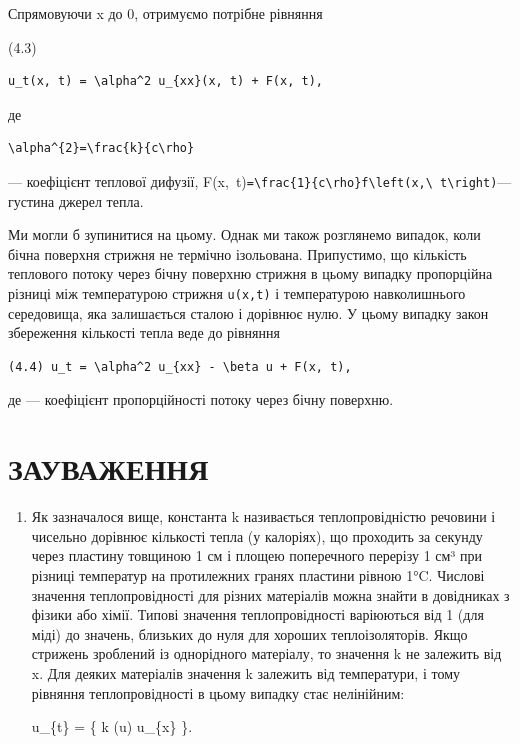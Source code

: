 \documentclass[
  ukrainian,
]{article}
\begin{document}
Спрямовуючи \Delta x до 0, отримуємо потрібне рівняння

(4.3)

\begin{verbatim}
u_t(x, t) = \alpha^2 u_{xx}(x, t) + F(x, t),
\end{verbatim}

де

\begin{verbatim}
\alpha^{2}=\frac{k}{c\rho}
\end{verbatim}

--- коефіцієнт теплової дифузії,
F\left(x,~t\right)\texttt{=\textbackslash{}frac\{1\}\{c\textbackslash{}rho\}f\textbackslash{}left(x,\textbackslash{}\ t\textbackslash{}right)}---
густина джерел тепла.

Ми могли б зупинитися на цьому. Однак ми також розглянемо випадок, коли
бічна поверхня стрижня не термічно ізольована. Припустимо, що кількість
теплового потоку через бічну поверхню стрижня в цьому випадку
пропорційна різниці між температурою стрижня \texttt{u(x,t)} і
температурою навколишнього середовища, яка залишається сталою і дорівнює
нулю. У цьому випадку закон збереження кількості тепла веде до рівняння

\begin{verbatim}
(4.4) u_t = \alpha^2 u_{xx} - \beta u + F(x, t),
\end{verbatim}

де \beta --- коефіцієнт пропорційності потоку через бічну поверхню.

\section{ЗАУВАЖЕННЯ}\label{ux437ux430ux443ux432ux430ux436ux435ux43dux43dux44f-3}

\begin{enumerate}
\def\labelenumi{\arabic{enumi}.}
\item
  Як зазначалося вище, константа k називається теплопровідністю речовини
  і чисельно дорівнює кількості тепла (у калоріях), що проходить за
  секунду через пластину товщиною 1 см і площею поперечного перерізу 1
  см³ при різниці температур на протилежних гранях пластини рівною 1°C.
  Числові значення теплопровідності для різних матеріалів можна знайти в
  довідниках з фізики або хімії. Типові значення теплопровідності
  варіюються від 1 (для міді) до значень, близьких до нуля для хороших
  теплоізоляторів. Якщо стрижень зроблений із однорідного матеріалу, то
  значення k не залежить від x. Для деяких матеріалів значення k
  залежить від температури, і тому рівняння теплопровідності в цьому
  випадку стає нелінійним:

  u\_\{t\} =   \{ k (u)
  \textbar{} u\_\{x\} \}.
\end{enumerate}
\end{document}
